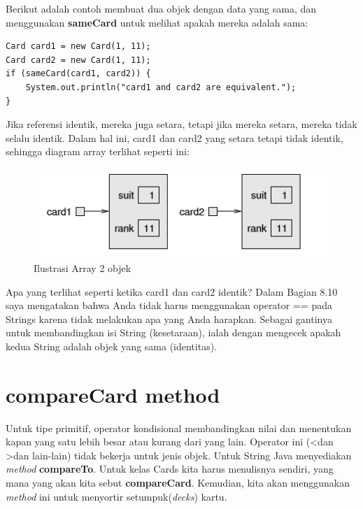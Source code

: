 \noindent Berikut adalah contoh membuat dua objek dengan data yang sama, dan menggunakan \textbf{sameCard} untuk melihat apakah mereka adalah sama:
\begin{lstlisting}
Card card1 = new Card(1, 11); 
Card card2 = new Card(1, 11);
if (sameCard(card1, card2)) { 
    System.out.println("card1 and card2 are equivalent.");
}
\end{lstlisting}

\noindent Jika referensi identik, mereka juga setara, tetapi jika mereka setara, mereka tidak selalu identik.
Dalam hal ini, card1 dan card2 yang setara tetapi tidak identik, sehingga diagram array terlihat seperti ini:
\begin{figure}[h!]
\centering
\includegraphics[scale=0.7]{diagram_array2.png}
\caption{Ilustrasi Array 2 objek}
\label{fig:univerise2}
\end{figure} \par

\noindent
\newline 
\newline 
\newline Apa yang terlihat seperti ketika card1 dan card2 identik?
Dalam Bagian 8.10 saya mengatakan bahwa Anda tidak harus menggunakan operator == pada Strings karena tidak melakukan apa yang Anda harapkan. Sebagai gantinya untuk membandingkan isi String (kesetaraan), ialah dengan mengecek apakah kedua String adalah objek yang sama (identitas).

\section{compareCard method}
Untuk tipe primitif, operator kondisional membandingkan nilai dan menentukan kapan yang satu lebih besar atau kurang dari yang lain. Operator ini (\textless  dan \textgreater dan lain-lain) tidak bekerja untuk jenis objek. Untuk String Java menyediakan \textit{method} \textbf{compareTo}. Untuk kelas Cards kita harus menulisnya sendiri, yang mana yang akan kita sebut \textbf{compareCard}. Kemudian, kita akan menggunakan \textit{method} ini untuk menyortir setumpuk(\textit{decks}) kartu.

